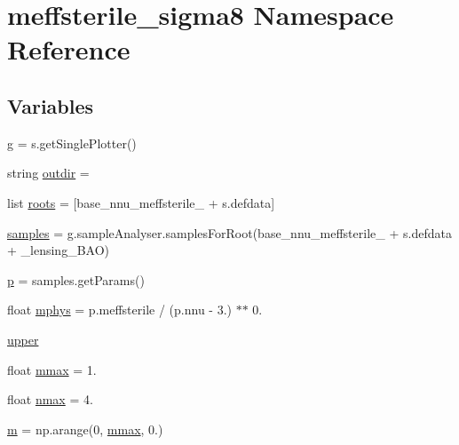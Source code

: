 \hypertarget{namespacemeffsterile__sigma8}{}\section{meffsterile\+\_\+sigma8 Namespace Reference}
\label{namespacemeffsterile__sigma8}
\subsection*{Variables}
\begin{DoxyCompactItemize}
\item 
\mbox{\hyperlink{namespacemeffsterile__sigma8_ac4771e1ebeb9f42dce89dde47826308c}{g}} = s.\+get\+Single\+Plotter()
\item 
string \mbox{\hyperlink{namespacemeffsterile__sigma8_ab507cafd80385d7c6d89d4acc4237879}{outdir}} = \textquotesingle{}\textquotesingle{}
\item 
list \mbox{\hyperlink{namespacemeffsterile__sigma8_a88d773a1a386a843f3aacb86196b9745}{roots}} = \mbox{[}\textquotesingle{}base\+\_\+nnu\+\_\+meffsterile\+\_\+\textquotesingle{} + s.\+defdata\mbox{]}
\item 
\mbox{\hyperlink{namespacemeffsterile__sigma8_aa9e2517630640d14a1fcbb0d0e92e32e}{samples}} = g.\+sample\+Analyser.\+samples\+For\+Root(\textquotesingle{}base\+\_\+nnu\+\_\+meffsterile\+\_\+\textquotesingle{} + s.\+defdata + \textquotesingle{}\+\_\+lensing\+\_\+\+B\+AO\textquotesingle{})
\item 
\mbox{\hyperlink{namespacemeffsterile__sigma8_a7313dce6ed4212f05469d970230c63c9}{p}} = samples.\+get\+Params()
\item 
float \mbox{\hyperlink{namespacemeffsterile__sigma8_ab5bd05273edb5844fb300171221f7e21}{mphys}} = p.\+meffsterile / (p.\+nnu -\/ 3.) $\ast$$\ast$ 0.
\item 
\mbox{\hyperlink{namespacemeffsterile__sigma8_a08a154b2355c8c54d018e6a8f58210a9}{upper}}
\item 
float \mbox{\hyperlink{namespacemeffsterile__sigma8_ab1ef9b443cf37c209a09928073b114ca}{mmax}} = 1.
\item 
float \mbox{\hyperlink{namespacemeffsterile__sigma8_a543dfdcb6935567ea0f877c0ed581d7d}{nmax}} = 4.
\item 
\mbox{\hyperlink{namespacemeffsterile__sigma8_a8ea5ae4bdea4d8c602da2c2ced40553c}{m}} = np.\+arange(0, \mbox{\hyperlink{namespacemeffsterile__sigma8_ab1ef9b443cf37c209a09928073b114ca}{mmax}}, 0.)
\item 
$$
\end{DoxyCompactItemize}
